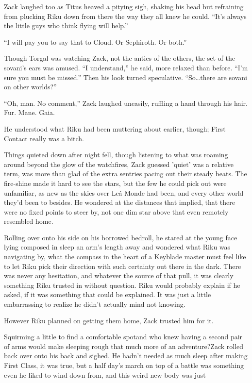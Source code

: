 Zack laughed too as Titus heaved a pitying sigh, shaking his head but refraining from plucking Riku down from there the way they all knew he could. ``It's always the little guys who think flying will help.''

``I will pay you to say that to Cloud. Or Sephiroth. Or both.''

Though Torgal was watching Zack, not the antics of the others, the set of the sovani's ears was amused. ``I understand,'' he said, more relaxed than before. ``I'm sure you must be missed.'' Then his look turned speculative. ``So\ldots there are sovani on other worlds?''

``Oh, man. No comment,'' Zack laughed uneasily, ruffling a hand through his hair. Fur. Mane. Gaia.

He understood what Riku had been muttering about earlier, though; First Contact really was a bitch.

Things quieted down after night fell, though listening to what was roaming around beyond the glow of the watchfires, Zack guessed 'quiet' was a relative term, was more than glad of the extra sentries pacing out their steady beats. The fire-shine made it hard to see the stars, but the few he could pick out were unfamiliar, as new as the skies over Leá Monde had been, and every other world they'd been to besides. He wondered at the distances that implied, that there were no fixed points to steer by, not one dim star above that even remotely resembled home.

Rolling over onto his side on his borrowed bedroll, he stared at the young face lying composed in sleep an arm's length away and wondered what Riku was navigating by, what the compass in the heart of a Keyblade master must feel like to let Riku pick their direction with such certainty out there in the dark. There was never any hesitation, and whatever the source of that pull, it was clearly something Riku trusted in without question. Riku would probably explain if he asked, if it was something that could be explained. It was just a little embarrassing to realize he didn't actually mind not knowing.

However Riku planned on getting them home, Zack trusted him for it.

Squirming a little to find a comfortable spot\textemdash and who knew having a second pair of arms would make sleeping rough that much more of an adventure?\textemdash Zack rolled back over onto his back and sighed. He hadn't needed as much sleep after making First Class, it was true, but a half day's march on top of a battle was something even he liked to wind down from, and this weird new body was just\textemdash 

